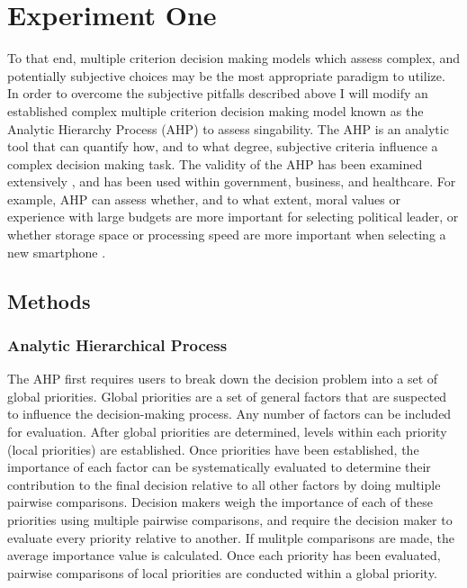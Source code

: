 \section{Experiment One}


To that end, multiple criterion decision making models which assess complex, and potentially subjective choices may be the most appropriate paradigm to utilize. In order to overcome the subjective pitfalls described above I will modify an established complex multiple criterion decision making model known as the Analytic Hierarchy Process (AHP) \cite{saaty1990make} to assess singability. The AHP is an analytic tool that can quantify how, and to what degree, subjective criteria influence a complex decision making task. The validity of the AHP has been examined extensively \cite{vaidya2006analytic}, and has been used within government, business, and healthcare. For example, AHP can assess whether, and to what extent, moral values or experience with large budgets are more important for selecting political leader, or whether storage space or processing speed are more important when selecting a new smartphone \cite{tuarob2015quantifying}. 

\subsection{Methods}

\subsubsection{Analytic Hierarchical Process}\label{sec:ahp}
The AHP first requires users to break down the decision problem into a set of global priorities. Global priorities are a set of general factors that are suspected to influence the decision-making process. Any number of factors can be included for evaluation. After global priorities are determined, levels within each priority (local priorities) are established. Once priorities have been established, the importance of each factor can be systematically evaluated to determine their contribution to the final decision relative to all other factors by doing multiple pairwise comparisons. Decision makers weigh the importance of each of these priorities using multiple pairwise comparisons, and require the decision maker to evaluate every priority relative to another. If mulitple comparisons are made, the average importance value is calculated. Once each priority has been evaluated, pairwise comparisons of local priorities are conducted within a global priority. 

